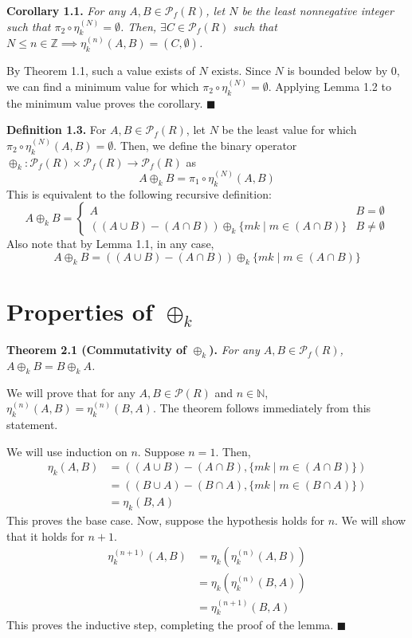 \documentclass{article}
\newcommand{\zee}{\mathbb{Z}}
\newcommand{\N}{\mathbb{N}}
\begin{document}
\textbf{Corollary 1.1.} \textit{
    For any $A, B \in \mathcal{P}_f(R)$, let $N$ be the
    least nonnegative integer such that
    $\pi_2 \circ \eta_k^{(N)} = \emptyset$. Then,
    $\exists C \in \mathcal{P}_f(R)$ such that
    $N \leq n \in \zee \implies \eta_k^{(n)}(A, B) = (C, \emptyset)$.
}

By Theorem 1.1, such a value exists of $N$ exists.
Since $N$ is bounded below by 0, we can find a minimum value for which
$\pi_2 \circ \eta_k^{(N)} = \emptyset$. Applying Lemma 1.2 to the
minimum value proves the corollary. $\blacksquare$

\textbf{Definition 1.3.} For $A, B \in \mathcal{P}_f(R)$,
let $N$ be the least value for which
$\pi_2 \circ \eta_k^{(N)}(A, B) = \emptyset$. Then, we define
the binary operator $\oplus_k: \mathcal{P}_f(R) \times \mathcal{P}_f(R)
\rightarrow \mathcal{P}_f(R)$ as
\[A \oplus_k B = \pi_1 \circ \eta_k^{(N)}(A, B)\]
This is equivalent to the following recursive definition:
\[A \oplus_k B = \begin{cases}
    A & B = \emptyset \\
    ((A \cup B) - (A \cap B)) \oplus_k \{mk \mid m \in (A \cap B)\}
        & B \neq \emptyset
\end{cases}\]
Also note that by Lemma 1.1, in any case,
\[A \oplus_k B
= ((A \cup B) - (A \cap B)) \oplus_k \{mk \mid m \in (A \cap B)\}\]

\section{Properties of $\oplus_k$}

\textbf{Theorem 2.1 (Commutativity of $\oplus_k$).} \textit{
    For any $A, B \in \mathcal{P}_f(R)$,
    $A \oplus_k B = B \oplus_k A$.
}

We will prove that for any $A, B \in \mathcal{P}(R)$ and $n \in \N$,
$\eta_k^{(n)}(A, B) = \eta_k^{(n)}(B, A)$. The theorem
follows immediately from this statement.

We will use induction on $n$. Suppose $n = 1$. Then,
\[\begin{split}
    \eta_k(A, B)
    &= ((A \cup B) - (A \cap B), \{mk \mid m \in (A \cap B)\}) \\
    &= ((B \cup A) - (B \cap A), \{mk \mid m \in (B \cap A)\}) \\
    &= \eta_k(B, A)
\end{split}\]
This proves the base case. Now, suppose the hypothesis holds
for $n$. We will show that it holds for $n+1$.
\[\begin{split}
    \eta_k^{(n+1)}(A, B) &= \eta_k(\eta_k^{(n)}(A, B)) \\
    &= \eta_k(\eta_k^{(n)}(B, A)) \\
    &= \eta_k^{(n+1)}(B, A)
\end{split}\]
This proves the inductive step, completing the proof of the
lemma. $\blacksquare$
\end{document}

